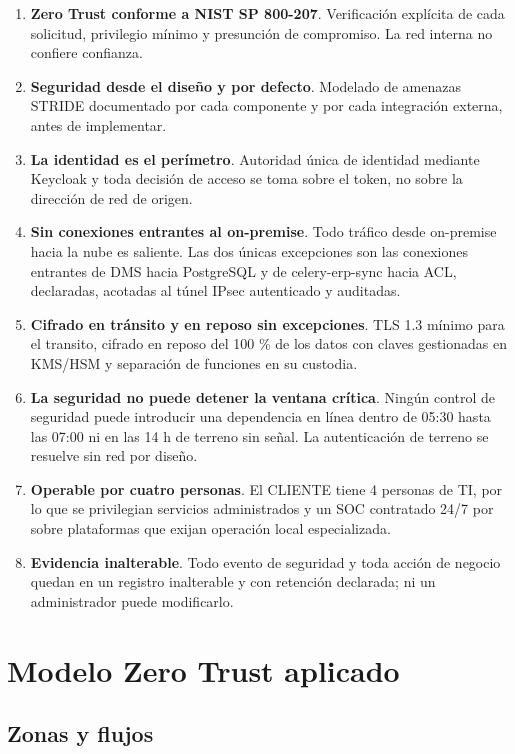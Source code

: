 \begin{enumerate}
  \item \textbf{Zero Trust conforme a NIST SP 800-207}. Verificación explícita de cada solicitud, privilegio mínimo y presunción de compromiso. La red interna no confiere confianza.
  \item \textbf{Seguridad desde el diseño y por defecto}. Modelado de amenazas STRIDE documentado por cada componente y por cada integración externa, antes de implementar.
  \item \textbf{La identidad es el perímetro}. Autoridad única de identidad mediante Keycloak y toda decisión de acceso se toma sobre el token, no sobre la dirección de red de origen.
  \item \textbf{Sin conexiones entrantes al on-premise}. Todo tráfico desde on-premise hacia la nube es saliente. Las dos únicas excepciones son las conexiones entrantes de DMS hacia PostgreSQL y de celery-erp-sync hacia ACL, declaradas, acotadas al túnel IPsec autenticado y auditadas.
  \item \textbf{Cifrado en tránsito y en reposo sin excepciones}. TLS 1.3 mínimo para el transito, cifrado en reposo del 100 \% de los datos con claves gestionadas en KMS/HSM y separación de funciones en su custodia.
  \item \textbf{La seguridad no puede detener la ventana crítica}. Ningún control de seguridad puede introducir una dependencia en línea dentro de 05:30 hasta las 07:00 ni en las 14 h de terreno sin señal. La autenticación de terreno se resuelve sin red por diseño.
  \item \textbf{Operable por cuatro personas}. El CLIENTE tiene 4 personas de TI, por lo que se privilegian servicios administrados y un SOC contratado 24/7 por sobre plataformas que exijan operación local especializada.
  \item \textbf{Evidencia inalterable}. Todo evento de seguridad y toda acción de negocio quedan en un registro inalterable y con retención declarada; ni un administrador puede modificarlo.
\end{enumerate}

\section{Modelo Zero Trust aplicado}
\label{sub:2-modelo-zero-trust-aplicado-art-21-1-nist}

\subsection{Zonas y flujos}

